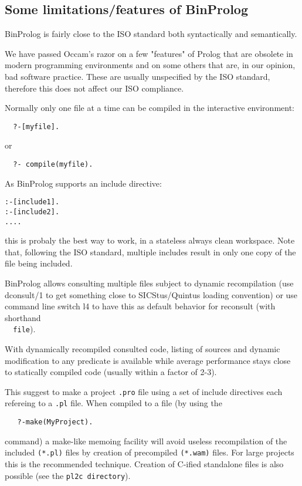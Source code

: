\documentclass{article}
\begin{document}
\subsection{Some limitations/features of BinProlog}

BinProlog is fairly close
to the ISO standard both syntactically and semantically.

We have passed Occam's razor on a few "features" of Prolog that are 
obsolete in modern programming environments and on some others that are,
in our opinion, bad software practice. These are usually unspecified by the ISO
standard, therefore this does not affect our ISO compliance.

Normally only one file at a time can be compiled in the interactive environment:

\begin{verbatim}
  ?-[myfile].
\end{verbatim}

or

\begin{verbatim}
  ?- compile(myfile).
\end{verbatim}

As BinProlog supports
an include directive:

\begin{verbatim}
:-[include1].
:-[include2].
....
\end{verbatim}

this is probaly the best way to work, in a stateless always clean
workspace. Note that, following the ISO standard, multiple includes
result in only one copy of the file being included.

BinProlog  allows consulting multiple files subject to
dynamic recompilation (use dconsult/1 to get something close
to SICStus/Quintus loading convention) or use command line switch
\-l4 to have this as default behavior for reconsult (with shorthand
{\tt \\~~file}).

With dynamically recompiled consulted code, listing of sources
and dynamic modification to any predicate is available while
average performance stays close to statically compiled code 
(usually within a factor of 2-3).

This suggest to make a project {\tt *.pro} file using a set of
include directives each refereing to a {\tt *.pl} file. 
When compiled to a file (by using the 
\begin{verbatim}
   ?-make(MyProject).
\end{verbatim}
command) a make-like memoing facility will avoid useless recompilation
of the included {\tt (*.pl)} files by creation of precompiled 
{\tt (*.wam)}
files. For large projects this is the recommended technique.
Creation of C-ified standalone files is also possible 
(see the {\tt pl2c directory}).
\end{document}
